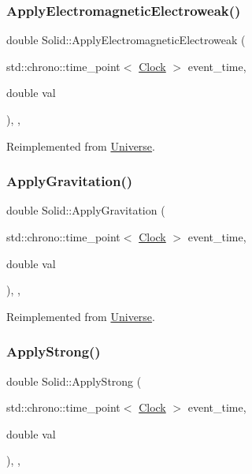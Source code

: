 \subsubsection{\texorpdfstring{Apply\+Electromagnetic\+Electroweak()}{ApplyElectromagneticElectroweak()}}
{\footnotesize\ttfamily double Solid\+::\+Apply\+Electromagnetic\+Electroweak (\begin{DoxyParamCaption}\item[{std\+::chrono\+::time\+\_\+point$<$ \mbox{\hyperlink{universe_8h_a0ef8d951d1ca5ab3cfaf7ab4c7a6fd80}{Clock}} $>$}]{event\+\_\+time,  }\item[{double}]{val }\end{DoxyParamCaption})\hspace{0.3cm}{\ttfamily [inline]}, {\ttfamily [final]}, {\ttfamily [virtual]}}



Reimplemented from \mbox{\hyperlink{classUniverse_a4c36c1ab30db993307f88363dde5e8c5}{Universe}}.

\mbox{\label{classSolid_af2b3133138ce2482faa462d07aa23042}} 
\subsubsection{\texorpdfstring{Apply\+Gravitation()}{ApplyGravitation()}}
{\footnotesize\ttfamily double Solid\+::\+Apply\+Gravitation (\begin{DoxyParamCaption}\item[{std\+::chrono\+::time\+\_\+point$<$ \mbox{\hyperlink{universe_8h_a0ef8d951d1ca5ab3cfaf7ab4c7a6fd80}{Clock}} $>$}]{event\+\_\+time,  }\item[{double}]{val }\end{DoxyParamCaption})\hspace{0.3cm}{\ttfamily [inline]}, {\ttfamily [final]}, {\ttfamily [virtual]}}



Reimplemented from \mbox{\hyperlink{classUniverse_a76c0b5e63c2a7d1988c44db341c3d64c}{Universe}}.

\mbox{\label{classSolid_a0801ec0382bc509191575bcf9f5c83c1}} 
\subsubsection{\texorpdfstring{Apply\+Strong()}{ApplyStrong()}}
{\footnotesize\ttfamily double Solid\+::\+Apply\+Strong (\begin{DoxyParamCaption}\item[{std\+::chrono\+::time\+\_\+point$<$ \mbox{\hyperlink{universe_8h_a0ef8d951d1ca5ab3cfaf7ab4c7a6fd80}{Clock}} $>$}]{event\+\_\+time,  }\item[{double}]{val }\end{DoxyParamCaption})\hspace{0.3cm}{\ttfamily [inline]}, {\ttfamily [final]}, {\ttfamily [virtual]}}



